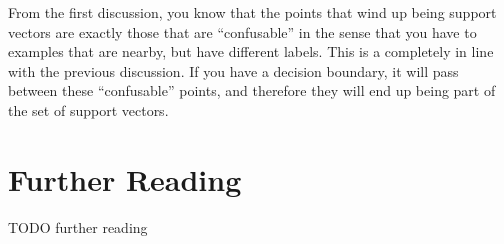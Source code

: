 From the first discussion, you know that the points that wind up being
support vectors are exactly those that are ``confusable'' in the sense
that you have to examples that are nearby, but have different labels.
This is a completely in line with the previous discussion.  If you
have a decision boundary, it will pass between these ``confusable''
points, and therefore they will end up being part of the set of
support vectors.

\begin{comment}
\section{Kernelized Regression}

Now, consider another example: linear regression (from
Section~\ref{sec:loss:reg}).  This was a linear model, under which $y
= \dotp{\vw}{\vx}+b$ and where the optimal weights are given in closed
form by:
%
\begin{align}
  \textcolor{darkred}{\vw} &= \textcolor{darkblue}{\left( \mat X \T \mat X + \la \eye_D \right)}\inv \textcolor{darkergreen}{\mat X \T \vec Y}
\end{align}
%
where $\mat X$ is the $N\times D$ data matrix, $\la$ is a
regularization parameter and $\vec Y$ is the $N\times 1$ vector of
labels.

This algorithm is, in some ways, even easier to kernelize than the
perceptron.  The optimal solution has a closed form, and
\end{comment}

\section{Further Reading}

TODO further reading





